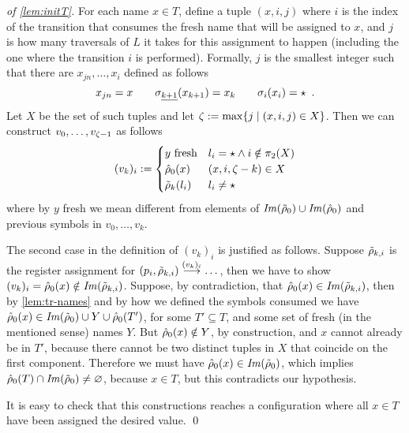 \begin{proof}[of \cref{lem:initT}]
For each name $x \in T$, define a tuple $(x,i,j)$ where $i$ is the index of the transition that consumes the fresh name that will be assigned to $x$, and $j$ is how many traversals of $L$ it takes for this assignment to happen (including the one where the transition $i$ is performed). Formally, $j$ is the smallest integer such that there are $x_{jn},\dots,x_i$ defined as follows
\[
	x_{jn} = x \qquad \sigma_{\underline{k+1}}(x_{k+1}) = x_k \qquad \sigma_i(x_i) = \star \enspace .
\]
Let $X$ be the set of such tuples and let $\zeta := \max \{ j \mid (x,i,j) \in X \}$. Then we can construct $v_0,\dots,v_{\zeta-1}$ as follows
\[
	(v_k)_i :=
	\begin{cases}
		\text{$y$ fresh} & l_i = \star \land i \notin \pi_2(X) \\
		\hat{\rho}_0(x) & (x,i,\zeta - k) \in X
		 \\
		\tilde{\rho}_{k}(l_i) & l_i \neq \star
	\end{cases}
\]
%
where by $y$ fresh we mean different from elements of $\mathit{Im}(\tilde{\rho}_0) \cup \mathit{Im}(\hat{\rho}_0)$ and previous symbols in $v_0,\dots,v_{k}$.

The second case in the definition of $(v_k)_i$ is justified as follows. Suppose $\tilde{\rho}_{k,i}$ is the register assignment for $(p_i,\tilde{\rho}_{k,i}) \overset{(v_k)_i}{\longrightarrow} \dots$, then we have to show $(v_k)_i = \hat{\rho}_0(x) \notin \mathit{Im}(\tilde{\rho}_{k,i})$. Suppose, by contradiction, that $\hat{\rho}_0(x) \in \mathit{Im}(\tilde{\rho}_{k,i})$, then by \cref{lem:tr-names} and by how we defined the symbols consumed we have $\hat{\rho}_0(x) \in \mathit{Im}(\tilde{\rho}_0) \cup Y \cup \hat{\rho}_0(T')$, for some $T' \subseteq T$, and some set of fresh (in the mentioned sense) names $Y$.
But $\hat{\rho}_0(x) \notin Y$, by construction, and $x$ cannot already be in $T'$, because there cannot be two distinct tuples in $X$ that coincide on the first component. Therefore we must have
$\hat{\rho}_0(x) \in \mathit{Im}(\tilde{\rho}_0)$, which implies $\hat{\rho}_0(T) \cap \mathit{Im}(\tilde{\rho}_0) \neq \varnothing$, because $x \in T$, but this contradicts our hypothesis.

It is easy to check that this constructions reaches a configuration where all $x \in T$ have been assigned the desired value. 
\qed
\end{proof}


